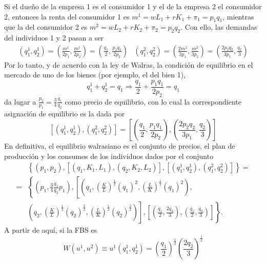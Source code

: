 \begin{enumerate}[a)]
		Si el dueño de la empresa 1 es el consumidor 1 y el de la empresa 2 el consumidor 2, entonces la renta del consumidor 1 es $m^1 = wL_1+rK_1+\pi_1=p_1q_1$, mientras que la del consumidor 2 es $m^2 = wL_2+rK_2+\pi_2=p_2q_2$. Con ello, las demandas del individuos 1 y 2 pasan a ser
			$$
				\begin{array}{c|c}
					\left( q_{1}^{1},q_{2}^{1}\right) = \left( \frac{m^1}{2p_1},\frac{m^1}{2p_2}\right) = \left( \frac{q_1}{2}, \frac{p_1q_1}{2p_2}\right) & \left( q_{1}^{2},q_{2}^{2}\right) = \left( \frac{2m^2}{3p_1},\frac{m^2}{3p_2}\right) = \left( \frac{2p_2q_2}{3p_1}, \frac{q_2}{3}\right)
				\end{array}
			$$
		Por lo tanto, y de acuerdo con la ley de Walras, la condición de equilibrio en el mercado de uno de los bienes (por ejemplo, el del bien 1),
			$$q_{1}^{1} + q_{2}^{1} = q_{1} \Rightarrow \frac{q_1}{2}+ \frac{p_1q_1}{2p_2} = q_{1}$$
		da lugar a $\frac{p_2}{p_1} = \frac{3}{4}\frac{q_1}{q_2}$ como precio de equilibrio, con lo cual la correspondiente asignación de equilibrio es la dada por 
			$$\left[ \left( q_{1}^{1},q_{2}^{1}\right) , \left( q_{1}^{2},q_{2}^{2}\right) \right] = \left[ \left(\frac{q_1}{2}, \frac{p_1q_1}{2p_2} \right) , \left( \frac{2p_2q_2}{3p_1}, \frac{q_2}{3}\right) \right] $$
		En definitiva, el equilibrio walrasiano es el conjunto de precios, el plan de producción y los consumos de los individuos dados por el conjunto
			$$
			\begin{aligned}
				&\left\{\left(p_{1}, p_{2}\right),\left[\left(q_{1}, K_{1}, L_{1}\right),\left(q_{2}, K_{2}, L_{2}\right)\right],\left[\left(q_{1}^{1}, q_{2}^{1}\right),\left(q_{1}^{2}, q_{2}^{2}\right)\right]\right\}=\\
				=&\left\{\left(p_{1}, \frac{3}{4} \frac{q_{1}}{q_{2}} p_{1}\right),\left[\left(q_{1},\left(\frac{K}{L}\right)^{\frac{1}{2}}\left(q_{1}\right)^{2},\left(\frac{L}{K}\right)^{\frac{1}{2}}\left(q_{1}\right)^{2}\right),\right.\right.\\
				&\left.\left.\left(q_{2},\left(\frac{K}{L}\right)^{\frac{1}{2}}\left(q_{2}\right)^{\frac{3}{2}},\left(\frac{L}{K}\right)^{\frac{1}{2}}\left(q_{2}\right)^{\frac{3}{2}}\right)\right],\left[\left(\frac{q_{1}}{2}, \frac{2 q_{2}}{3}\right),\left(\frac{q_{1}}{2}, \frac{q_{2}}{3}\right)\right]\right\} .
			\end{aligned}
			$$
		A partir de aquí, si la FBS es
			$$
			W\left(u^{1}, u^{2}\right) \equiv u^{1}\left(q_{1}^{1}, q_{2}^{1}\right)=\left(\frac{q_{1}}{2}\right)^{\frac{1}{2}}\left(\frac{2 q_{2}}{3}\right)^{\frac{1}{2}}
			$$

\end{enumerate}
